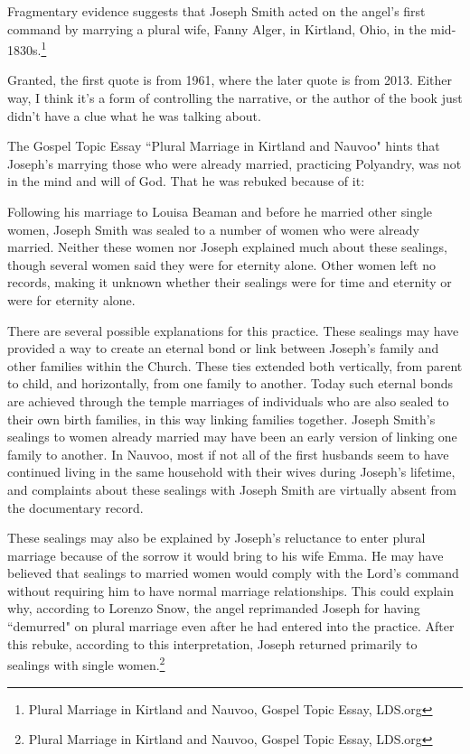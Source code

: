 \begin{displayquote}
Fragmentary evidence suggests that Joseph Smith acted on the angel’s first command by 
marrying a plural wife, Fanny Alger, in Kirtland, Ohio, in the mid-1830s.\footnote{
Plural Marriage in Kirtland and Nauvoo, Gospel Topic Essay, LDS.org
}
\end{displayquote}

Granted, the first quote is from 1961, where the later quote is from 2013. Either 
way, I think it's a form of controlling the narrative, or the author of the book just 
didn't have a clue what he was talking about.

The Gospel Topic Essay ``Plural Marriage in Kirtland and Nauvoo" hints that Joseph's
marrying those who were already married, practicing Polyandry, was not in the mind
and will of God. That he was rebuked because of it:

\begin{displayquote}
Following his marriage to Louisa Beaman and before he married other single women, 
Joseph Smith was sealed to a number of women who were already married. Neither these 
women nor Joseph explained much about these sealings, though several women said they 
were for eternity alone. Other women left no records, making it unknown whether 
their sealings were for time and eternity or were for eternity alone.

There are several possible explanations for this practice. These sealings may have 
provided a way to create an eternal bond or link between Joseph’s family and other 
families within the Church. These ties extended both vertically, from parent to 
child, and horizontally, from one family to another. Today such eternal bonds are 
achieved through the temple marriages of individuals who are also sealed to their 
own birth families, in this way linking families together. Joseph Smith’s sealings 
to women already married may have been an early version of linking one family to 
another. In Nauvoo, most if not all of the first husbands seem to have continued 
living in the same household with their wives during Joseph’s lifetime, and 
complaints about these sealings with Joseph Smith are virtually absent from the 
documentary record.

These sealings may also be explained by Joseph’s reluctance to enter plural marriage 
because of the sorrow it would bring to his wife Emma. He may have believed that 
sealings to married women would comply with the Lord’s command without requiring 
him to have normal marriage relationships. This could explain why, according to 
Lorenzo Snow, the angel reprimanded Joseph for having ``demurred" on plural marriage 
even after he had entered into the practice. After this rebuke, according to this 
interpretation, Joseph returned primarily to sealings with single women.\footnote{
Plural Marriage in Kirtland and Nauvoo, Gospel Topic Essay, LDS.org
}
\end{displayquote}